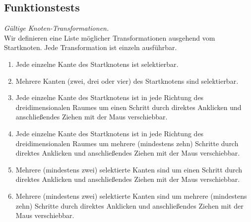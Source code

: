 %



\newpage



\label{Abschnitt:Tests:Protokoll:Funktion}



\subsection*{Funktionstests}



\begin{description}
	
	
	
\label{FT:10}
	
	\item[FT\_10] \textit{Gültige Knoten-Transformationen.} \hfill\\
	
	Wir definieren eine Liste möglicher Transformationen ausgehend vom Startknoten. Jede Transformation ist einzeln ausführbar.\\

	\begin{enumerate}
	
		\item Jede einzelne Kante des Startknotens ist selektierbar.
		\item Mehrere Kanten (zwei, drei oder vier) des Startknotens sind selektierbar.
			
		\item Jede einzelne Kante des Startknotens ist in jede Richtung des dreidimensionalen Raumes um einen Schritt durch direktes Anklicken und anschließendes Ziehen mit der Maus verschiebbar.
		\item Jede einzelne Kante des Startknotens ist in jede Richtung des dreidimensionalen Raumes um mehrere (mindestens zehn) Schritte durch direktes Anklicken und anschließendes Ziehen mit der Maus verschiebbar.
		\item Mehrere (mindestens zwei) selektierte Kanten sind um einen Schritt durch direktes Anklicken und anschließendes Ziehen mit der Maus verschiebbar.
		\item Mehrere (mindestens zwei) selektierte Kanten sind um mehrere (mindestens zehn) Schritte durch direktes Anklicken und anschließendes Ziehen mit der Maus verschiebbar.
		

\end{enumerate}
\end{description}

